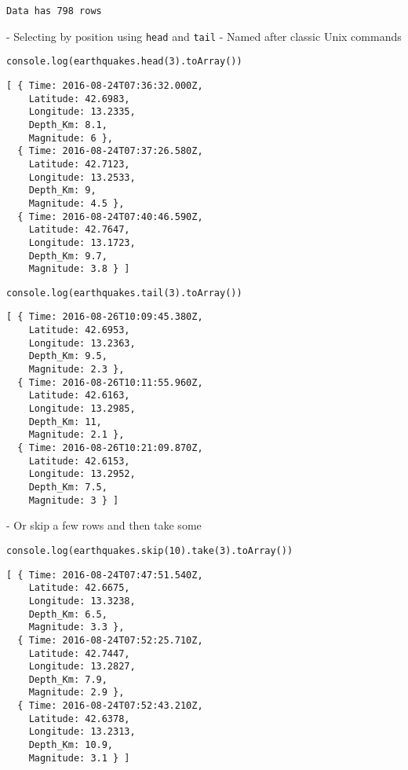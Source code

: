 \begin{verbatim}
Data has 798 rows
\end{verbatim}

-   Selecting by position using \texttt{head} and \texttt{tail}
    -   Named after classic Unix commands

\begin{verbatim}
console.log(earthquakes.head(3).toArray())
\end{verbatim}

\begin{verbatim}
[ { Time: 2016-08-24T07:36:32.000Z,
    Latitude: 42.6983,
    Longitude: 13.2335,
    Depth_Km: 8.1,
    Magnitude: 6 },
  { Time: 2016-08-24T07:37:26.580Z,
    Latitude: 42.7123,
    Longitude: 13.2533,
    Depth_Km: 9,
    Magnitude: 4.5 },
  { Time: 2016-08-24T07:40:46.590Z,
    Latitude: 42.7647,
    Longitude: 13.1723,
    Depth_Km: 9.7,
    Magnitude: 3.8 } ]
\end{verbatim}

\begin{verbatim}
console.log(earthquakes.tail(3).toArray())
\end{verbatim}

\begin{verbatim}
[ { Time: 2016-08-26T10:09:45.380Z,
    Latitude: 42.6953,
    Longitude: 13.2363,
    Depth_Km: 9.5,
    Magnitude: 2.3 },
  { Time: 2016-08-26T10:11:55.960Z,
    Latitude: 42.6163,
    Longitude: 13.2985,
    Depth_Km: 11,
    Magnitude: 2.1 },
  { Time: 2016-08-26T10:21:09.870Z,
    Latitude: 42.6153,
    Longitude: 13.2952,
    Depth_Km: 7.5,
    Magnitude: 3 } ]
\end{verbatim}

-   Or skip a few rows and then take some

\begin{verbatim}
console.log(earthquakes.skip(10).take(3).toArray())
\end{verbatim}

\begin{verbatim}
[ { Time: 2016-08-24T07:47:51.540Z,
    Latitude: 42.6675,
    Longitude: 13.3238,
    Depth_Km: 6.5,
    Magnitude: 3.3 },
  { Time: 2016-08-24T07:52:25.710Z,
    Latitude: 42.7447,
    Longitude: 13.2827,
    Depth_Km: 7.9,
    Magnitude: 2.9 },
  { Time: 2016-08-24T07:52:43.210Z,
    Latitude: 42.6378,
    Longitude: 13.2313,
    Depth_Km: 10.9,
    Magnitude: 3.1 } ]
\end{verbatim}



